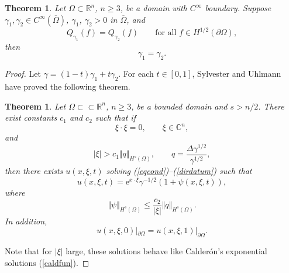 \documentclass[10pt, a4paper, twoside, openright]{book}
\theoremstyle{definition}
\theoremstyle{plain}
\newtheorem{theorem}[subsection]{Theorem}
\theoremstyle{plain}
\theoremstyle{plain}
\theoremstyle{plain}
\theoremstyle{plain}
\theoremstyle{plain}
\theoremstyle{plain}
\theoremstyle{plain}
\begin{document}
\begin{theorem}
\label{sy-ul-teo}
Let $\Omega\subset\mathbb{R}^n$, $n\geq3$, be a domain with
$C^{\infty}$ boundary. Suppose $\gamma_1, \gamma_2\in C^{\infty}(\overline{\Omega})$,
$\gamma_1$, $\gamma_2>0$ in $\overline{\Omega}$, and
\begin{equation}
\label{1=2}
Q_{\gamma_1}(f)=Q_{\gamma_2}(f)\qquad\textrm{for all }
f\in H^{1/2}(\partial\Omega),
\end{equation}
then
$$\gamma_1=\gamma_2.$$
\end{theorem}
\begin{proof}
Let $\gamma=(1-t)\gamma_1+t\gamma_2$.
For each $t\in[0,1]$, Sylvester and Uhlmann have proved the following theorem.

\begin{theorem}
\label{expgrowsol}
Let $\Omega\subset\subset\mathbb{R}^n$, $n\geq3$, be a bounded domain
and $s>n/2$.
There exist constants $c_1$ and $c_2$ such that if
$$\xi\cdot\xi=0,\qquad\xi\in\mathbb{C}^n,$$
and
$$|\xi|>c_1\Vert q\Vert_{H^s(\Omega)},
\qquad q=\frac{\Delta\gamma^{1/2}}{\gamma^{1/2}},$$
then there exists $u(x,\xi,t)$ solving (\ref{eqcond})--(\ref{dirdatum})
such that
\begin{equation}
\label{opticsol}
u(x,\xi,t)=\mathrm{e}^{x\cdot\xi}\gamma^{-1/2}(1+\psi(x,\xi,t)),
\end{equation}
where
\begin{equation}
\label{optics2}
\Vert\psi\Vert_{H^s(\Omega)}\leq\frac{c_2}{|\xi|}
\Vert q\Vert_{H^s(\Omega)}.
\end{equation}
In addition,
\begin{equation}
\label{opt}
u(x,\xi,0)|_{\partial\Omega}=u(x,\xi,1)|_{\partial\Omega}.
\end{equation}
\end{theorem}
Note that for $|\xi|$ large, these solutions behave like Calder\'on's
exponential solutions (\ref{caldfun}).


\end{proof}
\end{document}
